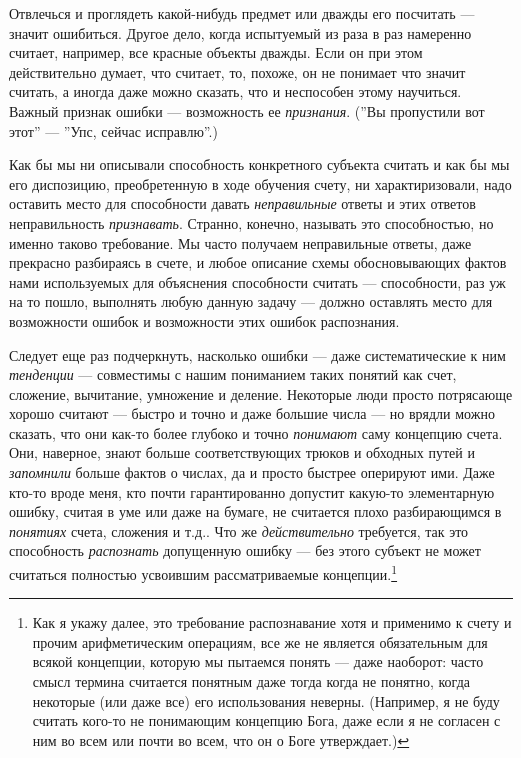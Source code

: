 \documentclass[11pt]{book}
\begin{document}
Отвлечься и проглядеть какой-нибудь предмет или дважды его посчитать --- значит ошибиться. Другое дело, когда испытуемый из раза в раз намеренно считает, например, все красные объекты дважды. Если он при этом действительно думает, что считает, то, похоже, он не понимает что значит считать, а иногда даже можно сказать, что и неспособен этому научиться. Важный признак ошибки --- возможность ее \textit{признания}. (''Вы пропустили вот этот'' --- ''Упс, сейчас исправлю''.)

Как бы мы ни описывали способность конкретного субъекта считать и как бы мы его диспозицию, преобретенную в ходе обучения счету, ни характиризовали, надо оставить место для способности давать \textit{неправильные} ответы и этих ответов неправильность \textit{признавать}. Странно, конечно, называть это способностью, но именно таково требование. Мы часто получаем неправильные ответы, даже прекрасно разбираясь в счете, и любое описание схемы обосновывающих фактов нами используемых для объяснения способности считать --- способности, раз уж на то пошло, выполнять любую данную задачу --- должно оставлять место для возможности ошибок и возможности этих ошибок распознания.

Следует еще раз подчеркнуть, насколько ошибки --- даже систематические к ним \textit{тенденции} --- совместимы с нашим пониманием таких понятий как счет, сложение, вычитание, умножение и деление. Некоторые люди просто потрясающе хорошо считают --- быстро и точно и даже большие числа --- но врядли можно сказать, что они как-то более глубоко и точно \textit{понимают} саму концепцию счета. Они, наверное, знают больше соответствующих трюков и обходных путей и \textit{запомнили} больше фактов о числах, да и просто быстрее оперируют ими. Даже кто-то вроде меня, кто почти гарантированно допустит какую-то элементарную ошибку, считая в уме или даже на бумаге, не считается плохо разбирающимся в \textit{понятиях} счета, сложения и т.д.. Что же \textit{действительно} требуется, так это способность \textit{распознать} допущенную ошибку --- без этого субъект не может считаться полностью усвоившим рассматриваемые концепции.\footnote{Как я укажу далее, это требование распознавание хотя и применимо к счету и прочим арифметическим операциям, все же не является обязательным для всякой концепции, которую мы пытаемся понять --- даже наоборот: часто смысл термина считается понятным даже тогда когда не понятно, когда некоторые (или даже все) его использования неверны. (Например, я не буду считать кого-то не понимающим концепцию Бога, даже если я не согласен с ним во всем или почти во всем, что он о Боге утверждает.)}
\end{document}
